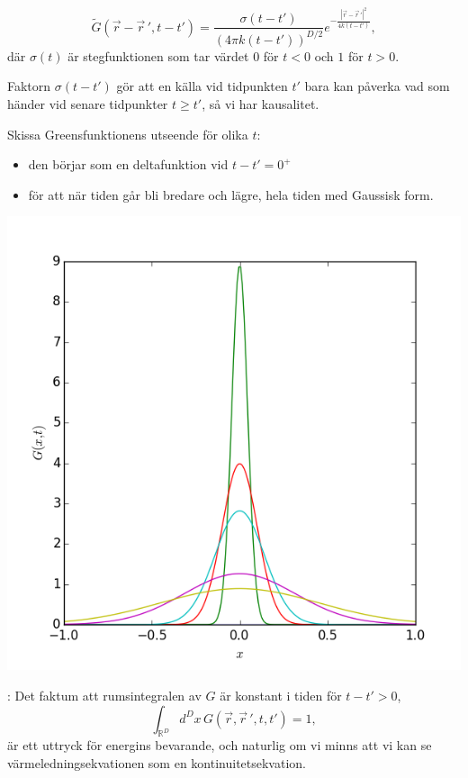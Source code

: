 \documentclass[%
oneside,                 %
final,                   %
10pt]{article}
\newcommand{\longinlinecomment}[3]{{\color{red}{\bf #1}: #2}}
\begin{document}
\noindent
$$
\tilde G(\vec{r}-\vec{r}\,',t-t')=\frac{\sigma(t-t')}{(4\pi k (t-t'))^{D/2}}
e^{-\frac{|\vec{r}-\vec{r}\,'|^2}{4k(t-t')}},
$$
där $\sigma(t)$ är stegfunktionen som tar värdet $0$ för $t<0$
och $1$ för $t>0$.

Faktorn $\sigma(t-t')$ gör att en källa vid tidpunkten $t'$ bara kan påverka vad som händer vid senare tidpunkter $t\geq t'$, så vi har kausalitet.

Skissa Greensfunktionens utseende för olika $t$:
\begin{itemize}
\item den börjar som en deltafunktion vid $t-t'=0^+$ 

\item för att när tiden går bli bredare och lägre, hela tiden med Gaussisk form. 
\end{itemize}

\noindent
\centerline{\includegraphics[width=0.95\linewidth]{fig/greens_function_1dim_wtime.png}}




\longinlinecomment{Comment 6}{ Det faktum att rumsintegralen av $G$ är konstant i tiden för $t-t'>0$, $$ \int_{\mathbb{R}^D}d^Dx\,G(\vec{r},\vec{r}\,',t,t')=1, $$ är ett uttryck för energins bevarande, och naturlig om vi minns att vi kan se värmeledningsekvationen som en kontinuitetsekvation. }{ Det faktum att rumsintegralen }
\end{document}
